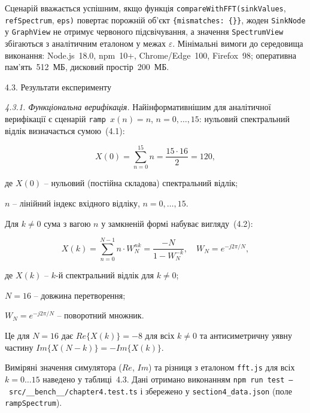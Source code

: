 \documentclass[
]{article}
\begin{document}
Сценарій вважається успішним, якщо функція
\texttt{compareWithFFT}\texttt{(}\texttt{sinkValues},
\texttt{refSpectrum}, \texttt{eps}\texttt{)} повертає порожній об'єкт
\texttt{\{}\texttt{mismatches}\texttt{:\ \{\}\}}, жоден
\texttt{SinkNode} у \texttt{GraphView} не отримує червоного
підсвічування, а значення \texttt{SpectrumView} збігаються з
аналітичним еталоном у межах \(\varepsilon\). Мінімальні вимоги до
середовища виконання: Node.js~18.0, npm~10+, Chrome/Edge~100,
Firefox~98; оперативна пам'ять~512~МБ, дисковий простір~200~МБ.

\protect{}\label{_Toc229681167}{}4.3. Результати
експерименту

\emph{4.3.1. Функціональна верифікація.} Найінформативнішим для
аналітичної верифікації є сценарій \texttt{ramp}\texttt{\ }\(x(n) = n\),
\(n = 0,\ldots,15\): нульовий спектральний відлік визначається сумою~(4.1):

\begin{equation}
\tag{4.1}\label{eq:ramp-X0}
X(0) = \sum_{n = 0}^{15}n = \frac{15 \cdot 16}{2} = 120,
\end{equation}

де \(X(0)\) -- нульовий (постійна складова) спектральний відлік;

\(n\) -- лінійний індекс вхідного відліку, \(n = 0,\ldots,15\).

Для \(k \neq 0\) сума з вагою \(n\) у замкненій формі набуває вигляду~(4.2):

\begin{equation}
\tag{4.2}\label{eq:ramp-Xk}
X(k) = \sum_{n = 0}^{N - 1}n \cdot W_{N}^{nk} = \frac{- N}{1 - W_{N}^{-k}},\quad W_{N} = e^{- j2\pi/N},
\end{equation}

де \(X(k)\) -- \(k\)-й спектральний відлік для \(k \neq 0\);

\(N = 16\) -- довжина перетворення;

\(W_{N} = e^{- j2\pi/N}\) -- поворотний множник.

Це для \(N = 16\) дає \(Re\{ X(k)\} = - 8\) для всіх \(k \neq 0\) та
антисиметричну уявну частину \(Im\{ X(N - k)\} = - Im\{ X(k)\}\).

Виміряні значення симулятора (\(Re\), \(Im\)) та різниця з еталоном
\texttt{fft.js} для всіх \(k = 0\ldots 15\) наведено у таблиці~4.3.
Дані отримано виконанням
\texttt{npm}~\texttt{run}~\texttt{test}~\texttt{--}~\texttt{src/\_\_bench\_\_/chapter4.test.ts}
і збережено у \texttt{section4\_data.json} (поле \texttt{rampSpectrum}).
\end{document}
